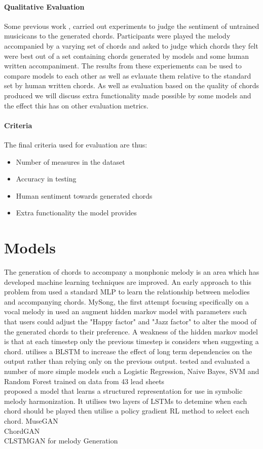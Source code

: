 \paragraph{Qualitative Evaluation}
Some previous work \cite{MySong}, \cite{BLSTM} carried out experiments to judge the sentiment of untrained musicicans to the generated chords.
Participants were played the melody accompanied by a varying set of chords and asked to judge which chords they felt were best out of a set containing chords generated by models and some human written accompaniment.
The results from these experiements can be used to compare models to each other as well as evlauate them relative to the standard set by human written chords.
As well as evaluation based on the quality of chords produced we will discuss extra functionality made possible by some models and the effect this has on other evaluation metrics.

\paragraph{Criteria}
The final criteria used for evaluation are thus:
\begin{itemize}
    \item Number of measures in the dataset
    \item Accuracy in testing
    \item Human sentiment towards generated chords
    \item Extra functionality the model provides
\end{itemize}
\section{Models}

The generation of chords to accompany a monphonic melody is an area which has developed machine learning techniques are improved. 
An early approach to this problem from \cite{ChordPrediction} used a standard MLP to learn the relationship between melodies and accompanying chords.
MySong, the first attempt focusing specifically on a vocal melody in \cite{MySong} used an augment hidden markov model with parameters such that users could adjust the "Happy factor" and "Jazz factor" to alter the mood of the generated chords to their preference.
A weakness of the hidden markov model is that at each timestep only the previous timestep is considers when suggesting a chord. 
\cite{BLSTM} utilises a BLSTM to increase the effect of long term dependencies on the output rather than relying only on the previous output.
\cite{MLForChords} tested and evaluated a number of more simple models such a Logistic Regression, Naive Bayes, SVM and Random Forest trained on data from 43 lead sheets \\
\cite{ReinforcementLearning} proposed a model  that learns a structured representation for use in symbolic melody harmonization. It utilises two layers of LSTMs to detemine when each chord should be played then utilise a policy gradient RL method to select each chord.
MuseGAN \\      
ChordGAN \\       
CLSTMGAN for melody Generation \\

